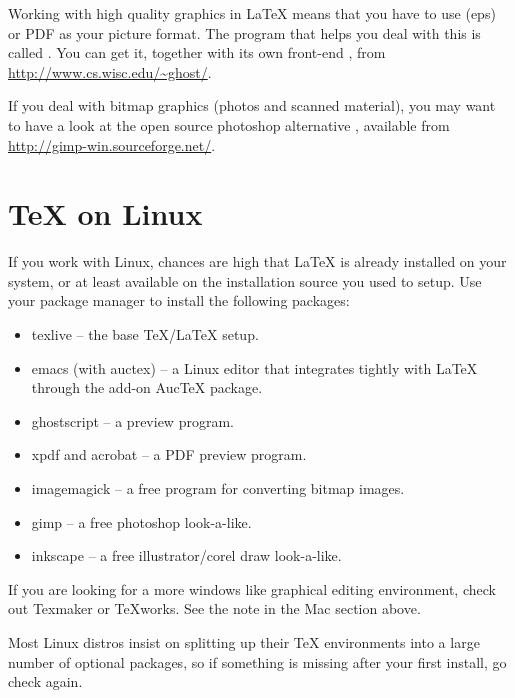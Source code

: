 Working with high quality graphics in \LaTeX{} means that you have to use
\EPSi{} (eps) or PDF as your picture format. The program that helps you
deal with this is called . You can get it, together with its
own front-end , from \url{http://www.cs.wisc.edu/~ghost/}.

If you deal with bitmap graphics (photos and scanned material), you may want
to have a look at the open source photoshop alternative , available
from \url{http://gimp-win.sourceforge.net/}.

\section{\TeX{} on Linux}

If you work with Linux, chances are high that \LaTeX{} is already installed
on your system, or at least available on the installation source you used to
setup. Use your package manager to install the following packages:

\begin{itemize}
\item texlive -- the base \TeX{}/\LaTeX{} setup.
\item emacs (with auctex) -- a Linux editor that integrates tightly with \LaTeX{} through the add-on AucTeX package.
\item ghostscript -- a \PSi{} preview program.
\item xpdf and acrobat -- a PDF preview program.
\item imagemagick -- a free program for converting bitmap images.
\item gimp -- a free photoshop look-a-like.
\item inkscape -- a free illustrator/corel draw look-a-like.
\end{itemize}

If you are looking for a more windows like graphical editing environment,
check out Texmaker or \TeX{}works. See the note in the Mac section above.

Most Linux distros insist on splitting up their \TeX{} environments into a
large number of optional packages, so if something is missing after your
first install, go check again.
